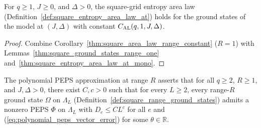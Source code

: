 \begin{lemma}
    \label{thm:square_area_law_closed_constant}
    \leanok
    For $q\ge1$, $J\ge0$, and $\Delta>0$, the square-grid entropy area
    law (Definition~\ref{def:square_entropy_area_law_at}) holds for the
    ground states of the model at $(J,\Delta)$ with constant $C_{\rm AL}(q,1,J,\Delta)$.
\end{lemma}
\begin{proof}
    \leanok
    Combine Corollary~\ref{thm:square_area_law_range_constant} ($R=1$) with Lemmas~\ref{thm:square_ground_states_range_one} and~\ref{thm:square_entropy_area_law_at_mono}.
\end{proof}

\begin{definition}
    \label{def:polynomial_peps_range}
    \leanok
    The polynomial PEPS approximation at range $R$ asserts that for all $q\ge2$, $R\ge1$, and $J,\Delta>0$, there exist $C,c>0$ such that for every $L\ge2$, every range-$R$ ground state $\Omega$ on $\Lambda_L$ (Definition~\ref{def:square_range_ground_states}) admits a nonzero PEPS $\Phi$ on $\Lambda_L$ with $D_e\le CL^c$ for all $e$ and (\ref{eq:polynomial_peps_vector_error}) for some $\theta\in\mathbb R$.
\end{definition}

